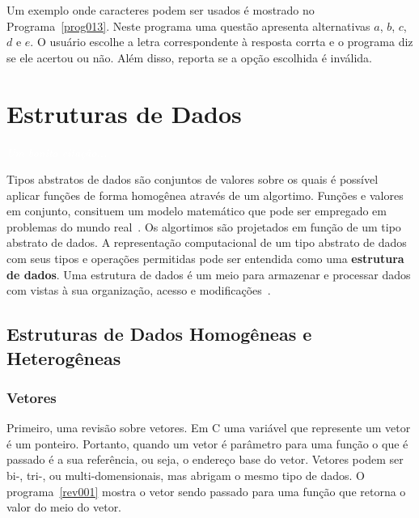 \documentclass[11pt,fleqn]{book} %
\begin{document}
Um exemplo onde caracteres podem ser usados é mostrado no Programa~\ref{prog013}.
Neste programa uma questão apresenta alternativas $a$, $b$, $c$, $d$ e $e$. 
O usuário escolhe a letra correspondente à resposta corrta e o programa diz se ele acertou ou não. 
Além disso, reporta se a opção escolhida é inválida.


\chapter{Estruturas de Dados}\label{estrutura}
\vspace{6em}
\begin{flushright}
	\textit{\textcolor{white}{Um bonita citação...}}
\end{flushright}
\vspace{12em}

Tipos abstratos de dados são conjuntos de valores sobre os quais é possível aplicar funções de forma homogênea através de um algortimo.
Funções e valores em conjunto, consituem um modelo matemático que pode ser empregado em problemas do mundo real~\cite{ascencio2010}.
Os algortimos são projetados em função de um tipo abstrato de dados.
A representação computacional de um tipo abstrato de dados com seus tipos e operações permitidas pode ser entendida como uma \textbf{estrutura de dados}.
Uma estrutura de dados é um meio para armazenar e processar dados com vistas à sua organização, acesso e modificações~\cite{cormen2009}.


\newpage
\section{Estruturas de Dados Homogêneas e Heterogêneas}\label{tipos}

\subsection*{Vetores}

Primeiro, uma revisão sobre vetores.
Em C uma variável que represente um vetor é um ponteiro.
Portanto, quando um vetor é parâmetro para uma função o que é passado é a sua referência, ou seja, o endereço base do vetor.
Vetores podem ser bi-, tri-, ou multi-domensionais, mas abrigam o mesmo tipo de dados.
O programa~\ref{rev001} mostra o vetor sendo passado para uma função que retorna o valor do meio do vetor.
\end{document}
